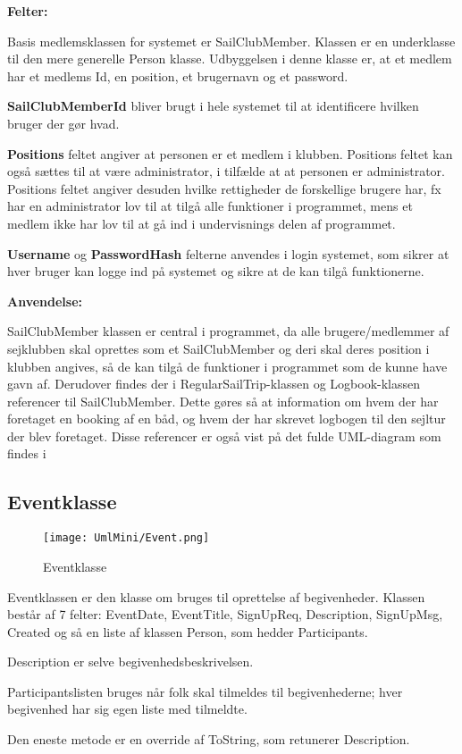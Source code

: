 \textbf{Felter:}

Basis medlemsklassen for systemet er SailClubMember. 
Klassen er en underklasse til den mere generelle Person klasse. 
Udbyggelsen i denne klasse er, at et medlem har et medlems Id, en position, et brugernavn og et password.

\textbf{SailClubMemberId} bliver brugt i hele systemet til at identificere hvilken bruger der gør hvad. 

\textbf{Positions} feltet angiver at personen er et medlem i klubben. 
Positions feltet kan også sættes til at være administrator, i tilfælde at at personen er administrator. 
Positions feltet angiver desuden hvilke rettigheder de forskellige brugere har, fx har en administrator lov til at tilgå alle funktioner i programmet, mens et medlem ikke har lov til at gå ind i undervisnings delen af programmet. 

\textbf{Username} og \textbf{PasswordHash} felterne anvendes i login systemet, som sikrer at hver bruger kan logge ind på systemet og sikre at de kan tilgå funktionerne.

\textbf{Anvendelse:}

SailClubMember klassen er central i programmet, da alle brugere/medlemmer af sejklubben skal oprettes som et SailClubMember og deri skal deres position i klubben angives, så de kan tilgå de funktioner i programmet som de kunne have gavn af. Derudover findes der i RegularSailTrip-klassen og Logbook-klassen referencer til SailClubMember. Dette gøres så at information om hvem der har foretaget en booking af en båd, og hvem der har skrevet logbogen til den sejltur der blev foretaget. Disse referencer er også vist på det fulde UML-diagram som findes i 
 
\subsection{Eventklasse}

\begin{wrapfigure}{l}{0.5\textwidth}
    \label{img:login_interface}
    \vspace{-20pt}
    \begin{center}
        \texttt{[image: UmlMini/Event.png]}
    \end{center}
    \vspace{-20pt}
    \caption{Eventklasse}
    \vspace{-10pt}
\end{wrapfigure}
Eventklassen er den klasse om bruges til oprettelse af  begivenheder. Klassen består af 7 felter: EventDate, EventTitle, SignUpReq, Description, SignUpMsg, Created og så en liste af klassen Person, som hedder Participants.

Description er selve begivenhedsbeskrivelsen. 

Participantslisten bruges når folk skal tilmeldes til begivenhederne; hver begivenhed har sig egen liste med tilmeldte. 

Den eneste metode er en override af ToString, som retunerer Description.

